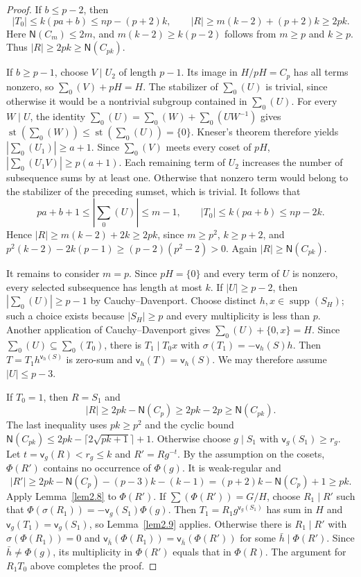 \documentclass[10pt,a4paper]{amsart}
\theoremstyle{definition}
\theoremstyle{remark}
\numberwithin{equation}{section}
\DeclareMathOperator{\supp}{supp}
\DeclareMathOperator{\st}{st}
\begin{document}
\begin{proof}
If $b\le p-2$, then
\[
 |T_0|\le k(pa+b)\le np-(p+2)k,
 \qquad |R|\ge m(k-2)+(p+2)k\ge2pk.
\]
Here $\mathsf N(C_m)\le2m$, and
$m(k-2)\ge k(p-2)$ follows from $m\ge p$ and $k\ge p$.
Thus $|R|\ge2pk\ge\mathsf N(C_{pk})$.

If $b\ge p-1$, choose $V\mid U_2$ of length $p-1$.
Its image in $H/pH=C_p$ has all terms nonzero, so
$\sum_0(V)+pH=H$.
The stabilizer of $\sum_0(U)$ is trivial, since otherwise it would be a
nontrivial subgroup contained in $\sum_0(U)$.
For every $W\mid U$, the identity
$\sum_0(U)=\sum_0(W)+\sum_0(UW^{-1})$ gives
$\st(\sum_0(W))\le\st(\sum_0(U))=\{0\}$.
Kneser's theorem therefore yields $|\sum_0(U_1)|\ge a+1$.
Since $\sum_0(V)$ meets every coset of $pH$,
$|\sum_0(U_1V)|\ge p(a+1)$.
Each remaining term of $U_2$ increases the number of subsequence sums
by at least one. Otherwise that nonzero term would belong to the
stabilizer of the preceding sumset, which is trivial.
It follows that
\[
 pa+b+1\le|\sum_0(U)|\le m-1,\qquad |T_0|\le k(pa+b)\le np-2k.
\]
Hence $|R|\ge m(k-2)+2k\ge2pk$, since $m\ge p^2$, $k\ge p+2$, and
$p^2(k-2)-2k(p-1)\ge(p-2)(p^2-2)>0$.
Again $|R|\ge\mathsf N(C_{pk})$.

It remains to consider $m=p$.
Since $pH=\{0\}$ and every term of $U$ is nonzero, every selected
subsequence has length at most $k$.
If $|U|\ge p-2$, then $|\sum_0(U)|\ge p-1$ by Cauchy--Davenport.
Choose distinct $h,x\in\supp(S_H)$; such a choice exists because
$|S_H|\ge p$ and every multiplicity is less than $p$.
Another application of Cauchy--Davenport gives
$\sum_0(U)+\{0,x\}=H$.
Since $\sum_0(U)\subseteq\sum_0(T_0)$, there is $T_1\mid T_0x$
with $\sigma(T_1)=-\mathsf v_h(S)h$.
Then $T=T_1h^{\mathsf v_h(S)}$ is zero-sum and
$\mathsf v_h(T)=\mathsf v_h(S)$.
We may therefore assume $|U|\le p-3$.

If $T_0=1$, then $R=S_1$ and
\[
 |R|\ge2pk-\mathsf N(C_p)\ge2pk-2p\ge\mathsf N(C_{pk}).
\]
The last inequality uses $pk\ge p^2$ and the cyclic bound
$\mathsf N(C_{pk})\le2pk-\lceil2\sqrt{pk+1}\rceil+1$.
Otherwise choose $g\mid S_1$ with $\mathsf v_g(S_1)\ge r_g$.
Let $t=\mathsf v_g(R)<r_g\le k$ and $R'=Rg^{-t}$.
By the assumption on the cosets, $\Phi(R')$ contains no occurrence of
$\Phi(g)$. It is weak-regular and
\[
 |R'|\ge2pk-\mathsf N(C_p)-(p-3)k-(k-1)
 =(p+2)k-\mathsf N(C_p)+1\ge pk.
\]
Apply Lemma~\ref{lem2.8} to $\Phi(R')$.
If $\sum(\Phi(R'))=G/H$, choose $R_1\mid R'$ such that
$\Phi(\sigma(R_1))=-\mathsf v_g(S_1)\Phi(g)$.
Then $T_1=R_1g^{\mathsf v_g(S_1)}$ has sum in $H$ and
$\mathsf v_g(T_1)=\mathsf v_g(S_1)$, so Lemma~\ref{lem2.9} applies.
Otherwise there is $R_1\mid R'$ with $\sigma(\Phi(R_1))=0$ and
$\mathsf v_{\bar h}(\Phi(R_1))=\mathsf v_{\bar h}(\Phi(R'))$
for some $\bar h\mid\Phi(R')$.
Since $\bar h\ne\Phi(g)$, its multiplicity in $\Phi(R')$ equals that
in $\Phi(R)$. The argument for $R_1T_0$ above completes the proof.
\end{proof}
\end{document}
